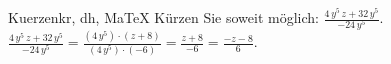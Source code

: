 \begin{MAufgabe}{Kuerzen}{kr, dh, MaTeX}
K\"urzen Sie soweit m\"oglich: $\frac{4\, y^5\, z + 32\, y^5}{- 24\, y^5}$.\\ 
\ifLsg\MLoesung
\quad $\frac{4\, y^5\, z + 32\, y^5}{- 24\, y^5}=\frac{(4\, y^5)\cdot(z + 8)}{(4\, y^5)\cdot(-6)}=\frac{z + 8}{-6}=\frac{ - z - 8}{6}$.\else\relax\fi
 \end{MAufgabe}